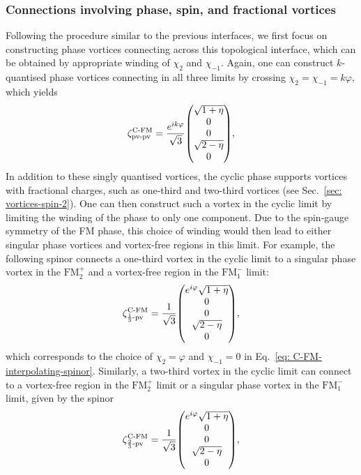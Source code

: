 \subsubsection{Connections involving phase, spin, and fractional vortices}
Following the procedure similar to the previous interfaces, we first focus on
constructing phase vortices connecting across this topological interface, which
can be obtained by appropriate winding of \(\chi_2\) and \(\chi_{-1}\).
Again, one can construct \(k\)-quantised phase vortices connecting in all three
limits by crossing \(\chi_2 = \chi_{-1} = k\varphi \), which yields
\begin{align}\label{eq: C-FM-pv-pv}
    \zeta^\text{C-FM}_\text{pv-pv} = \frac{e^{ik\varphi}}{\sqrt{3}}\mqty(
        \sqrt{1 + \eta} \\
        0 \\
        0 \\
        \sqrt{2 - \eta} \\
        0
    ),
\end{align}
In addition to these singly quantised vortices, the cyclic phase supports
vortices with fractional charges, such as one-third and two-third vortices (see
Sec.~\ref{sec: vortices-spin-2}).
One can then construct such a vortex in the cyclic limit by limiting the winding
of the phase to only one component.
Due to the spin-gauge symmetry of the FM phase, this choice of winding would
then lead to either singular phase vortices and vortex-free regions in this
limit.
For example, the following spinor connects a one-third vortex in the cyclic
limit to a singular phase vortex in the \(\text{FM}_2^+\) and a vortex-free
region in the \(\text{FM}_1^-\) limit:
\begin{align}\label{eq: C-FM-third-pv}
    \zeta^\text{C-FM}_{\frac{1}{3}\text{-pv}} = \frac{1}{\sqrt{3}}\mqty(
        e^{i\varphi}\sqrt{1 + \eta} \\
        0 \\
        0 \\
        \sqrt{2 - \eta} \\
        0
    ),
\end{align}
which corresponds to the choice of \(\chi_2 = \varphi \) and \(\chi_{-1} = 0\)
in Eq.~\eqref{eq: C-FM-interpolating-spinor}.
Similarly, a two-third vortex in the cyclic limit can connect to a vortex-free
region in the \(\text{FM}_2^+\) limit or a singular phase vortex in the
\(\text{FM}_1^-\) limit, given by the spinor
\begin{align}\label{eq: C-FM-2third-vf}
    \zeta^\text{C-FM}_{\frac{2}{3}\text{-pv}} = \frac{1}{\sqrt{3}}\mqty(
        e^{i\varphi}\sqrt{1 + \eta} \\
        0 \\
        0 \\
        \sqrt{2 - \eta} \\
        0
    ),
\end{align}
